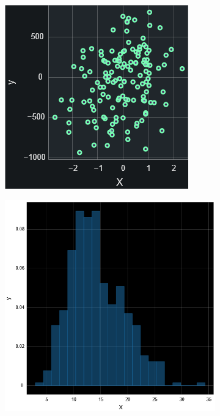 \begin{figure}
\begin{subfigure}[b]{0.32\textwidth}
        \centering
        \includegraphics[width=\textwidth]{figures/body/procedure/scatter.png}
    \end{subfigure}
    \hfill
    \begin{subfigure}[b]{0.32\textwidth}
        \centering
        \includegraphics[width=\textwidth]{figures/body/procedure/hist.png}

\end{subfigure}
\end{figure}
